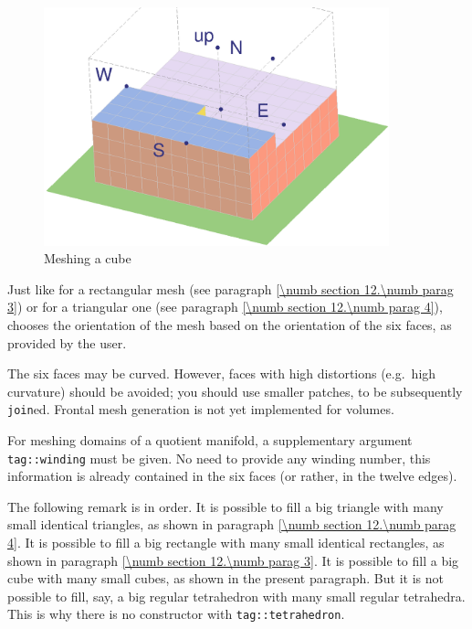 \begin{figure}[ht] \centering
  \includegraphics[width=100mm]{build-cube.eps}
  \caption{Meshing a cube}
  \label{\numb section 12.\numb fig 3}
\end{figure}

Just like for a rectangular mesh (see paragraph \ref{\numb section 12.\numb parag 3}) or for
a triangular one (see paragraph \ref{\numb section 12.\numb parag 4}),
{\maniFEM} chooses the orientation of the mesh based on the orientation of the six faces,
as provided by the user.

The six faces may be curved.
However, faces with high distortions (e.g.\ high curvature) should be avoided;
you should use smaller patches, to be subsequently {\small\tt join}ed.
Frontal mesh generation is not yet implemented for volumes.

For meshing domains of a quotient manifold, a supplementary argument
{\small\tt\textcolor{tag}{tag}::winding} must be given.
No need to provide any winding number, this information is already contained in the six faces
(or rather, in the twelve edges).

The following remark is in order.
It is possible to fill a big triangle with many small identical triangles, as shown in paragraph
\ref{\numb section 12.\numb parag 4}.
It is possible to fill a big rectangle with many small identical rectangles, as shown in paragraph
\ref{\numb section 12.\numb parag 3}.
It is possible to fill a big cube with many small cubes, as shown in the present paragraph.
But it is not possible to fill, say, a big regular tetrahedron with many small regular tetrahedra.
This is why there is no {\small\tt{}} constructor with
{\small\tt\textcolor{tag}{tag}::tetrahedron}.


